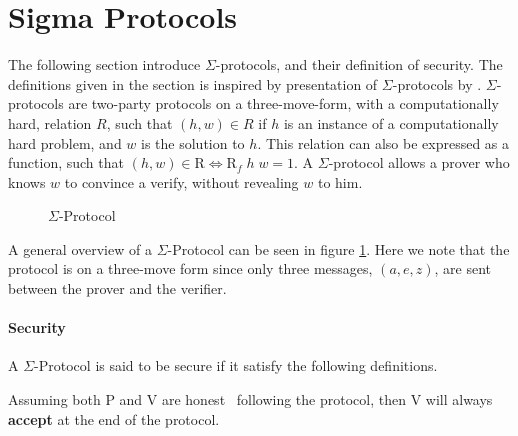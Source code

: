 \section{Sigma Protocols}
\label{sec:background:sigma_protocols}
The following section introduce $\Sigma$-protocols,
and their definition of security. The definitions given in the section is
inspired by presentation of $\Sigma$-protocols by \citet{on-sigma-protocols}.
$\Sigma$-protocols are two-party protocols on a three-move-form, with a
computationally hard, relation $R$, such that $(h, w) \in R$ if $h$ is an
instance of a computationally hard problem, and $w$ is the solution to $h$.
This relation can also be expressed as a function, such that
$(h,w) \in \text{R} \iff \text{R}_{f} \; h \; w = 1$.
A $\Sigma$-protocol allows a prover who knows $w$ to convince a
verify, without revealing $w$ to him.


\begin{figure}[ht]
  \centering
  \caption{\label{fig:proto_sigma} $\Sigma$-Protocol}
\end{figure}

A general overview of a $\Sigma$-Protocol can be seen in figure
\ref{fig:proto_sigma}. Here we note that the protocol is on a three-move form
since only three messages, $(a,e,z)$, are sent between the prover and the verifier.

\paragraph{Security}
A $\Sigma$-Protocol is said to be secure if it satisfy the following definitions.

\begin{definition}[Completeness]
  Assuming both P and V are honest \ie\ following the protocol, then V will always \textbf{accept} at
  the end of the protocol.
\end{definition}

